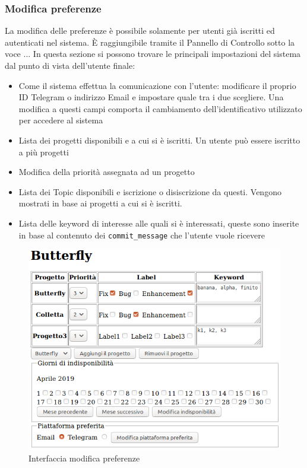 \subsubsection{Modifica preferenze} \label{modificaPreferenze}
La modifica delle preferenze è possibile solamente per utenti già iscritti ed autenticati nel sistema.
È raggiungibile tramite il Pannello di Controllo sotto la voce ... %
In questa sezione si possono trovare le principali impostazioni del sistema dal punto di vista dell'utente finale:
\begin{itemize}
	\item Come il sistema effettua la comunicazione con l'utente: modificare il proprio ID Telegram o indirizzo Email e impostare quale tra i due scegliere. Una modifica a questi campi comporta il cambiamento dell'identificativo utilizzato per accedere al sistema
	\item Lista dei progetti disponibili e a cui si è iscritti. Un utente può essere iscritto a più progetti
	\item Modifica della priorità assegnata ad un progetto
	\item Lista dei Topic disponibili e iscrizione o disiscrizione da questi. Vengono mostrati in base ai progetti a cui si è iscritti.
	\item Lista delle keyword di interesse alle quali si è interessati, queste sono inserite in base al contenuto dei \texttt{commit\_message} che l'utente vuole ricevere
\end{itemize}
\begin{figure}[H]
	\centering
	\includegraphics[width=\textwidth]{img/preferenze_1.png} %
	\caption{Interfaccia modifica preferenze}
\end{figure}

